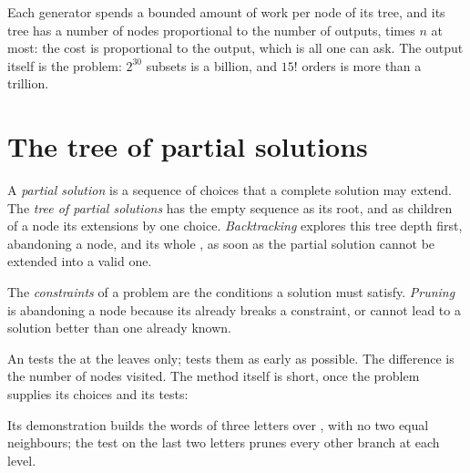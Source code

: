 Each generator spends a bounded amount of work per node of its tree, and its tree has a number of nodes proportional to
the number of outputs, times $n$ at most: the cost is proportional to the output, which is all one can ask. The output
itself is the problem: $2^{30}$ subsets is a billion, and $15!$ orders is more than a trillion.

\section{The tree of partial solutions}\label{sec:b1:backtracking:tree}

\begin{definition}\label{def:b1:backtracking:backtracking}
A \emph{partial solution} is a sequence of choices that a complete solution may extend. The
\emph{tree of partial solutions} has the empty sequence as its root, and as children of
a node its extensions by one choice. \emph{Backtracking} explores this tree depth first, abandoning
a node, and its whole , as soon as the partial solution cannot be extended into a valid one.
\end{definition}

\begin{definition}\label{def:b1:backtracking:pruning}
The \emph{constraints} of a problem are the conditions a solution must satisfy.
\emph{Pruning} is abandoning a node because its  already breaks a constraint, or cannot
lead to a solution better than one already known.
\end{definition}

An  tests the  at the leaves only;  tests them as early as possible. The
difference is the number of nodes visited. The method itself is short, once the problem supplies its choices and its
tests:

\label{lst:b1:backtracking:generic}

Its demonstration builds the words of three letters over ,  with no two equal neighbours; the test on
the last two letters prunes every other branch at each level.

